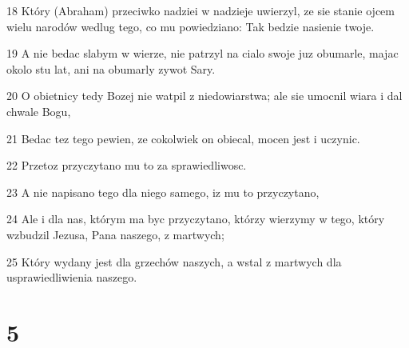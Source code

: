 \par 18 Który (Abraham) przeciwko nadziei w nadzieje uwierzyl, ze sie stanie ojcem wielu narodów wedlug tego, co mu powiedziano: Tak bedzie nasienie twoje.
\par 19 A nie bedac slabym w wierze, nie patrzyl na cialo swoje juz obumarle, majac okolo stu lat, ani na obumarly zywot Sary.
\par 20 O obietnicy tedy Bozej nie watpil z niedowiarstwa; ale sie umocnil wiara i dal chwale Bogu,
\par 21 Bedac tez tego pewien, ze cokolwiek on obiecal, mocen jest i uczynic.
\par 22 Przetoz przyczytano mu to za sprawiedliwosc.
\par 23 A nie napisano tego dla niego samego, iz mu to przyczytano,
\par 24 Ale i dla nas, którym ma byc przyczytano, którzy wierzymy w tego, który wzbudzil Jezusa, Pana naszego, z martwych;
\par 25 Który wydany jest dla grzechów naszych, a wstal z martwych dla usprawiedliwienia naszego.

\chapter{5}

